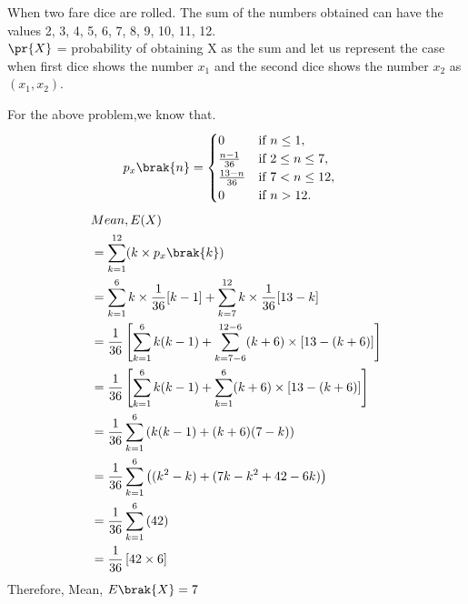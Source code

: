When two fare dice are rolled. The sum of the numbers obtained can have the values 2, 3, 4, 5, 6, 7, 8, 9, 10, 11, 12.\\
$\pr{X}$ = probability of obtaining X as the sum and let us represent the case when first dice shows the number $x_1$ and the second dice shows the number $x_2$ as $(x_1,x_2)$.
\begin{table}[hbt!]
\caption{Probability Distribution Table of X}
\label{table:1}
\end{table}
For the above problem,we know that.
\begin{align}
p_x\brak{n} &= 
  \begin{cases}
    0 & \text{if } n \leq 1,\\
    \frac{n-1}{36} & \text{if } 2 \leq n \leq 7,\\
    \frac{13-n}{36} & \text{if } 7 < n \leq 12,\\
    0 & \text{if } n>12.
  \end{cases}
\end{align}
\begin{align}
    &Mean,E(X) \nonumber\\
    & =\sum_{k=1}^{12} (k \times p_x\brak{k})\\
    & = \sum_{k=1}^{6}k\times\frac{1}{36}[k-1] + \sum_{k=7}^{12}k\times\frac{1}{36}[13-k]\\
    & = \frac{1}{36}\left[\sum_{k=1}^{6}k(k-1) + \sum_{k=7-6}^{12-6}(k+6)\times[13-(k+6)]\right]\\
    & = \frac{1}{36}\left[\sum_{k=1}^{6}k(k-1) + \sum_{k=1}^{6}(k+6)\times[13-(k+6)]\right]\\
    &= \frac{1}{36}\sum_{k=1}^{6}\left(k(k-1) + (k+6)(7-k)\right)\\
    &= \frac{1}{36}\sum_{k=1}^{6}\left((k^2- k)+ (7k-k^2+42-6k)\right)\\
    &= \frac{1}{36}\sum_{k=1}^{6}\left( 42\right)\\
    &= \frac{1}{36}\left[ 42 \times 6 \right]
\end{align}
Therefore,
 Mean, $E\brak{X} = 7$
 
